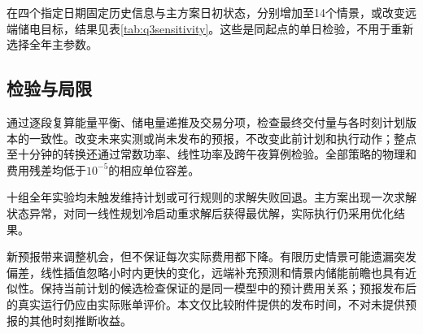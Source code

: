 在四个指定日期固定历史信息与主方案日初状态，分别增加至14个情景，或改变远端储电目标，结果见表\ref{tab:q3sensitivity}。这些是同起点的单日检验，不用于重新选择全年主参数。
\begin{table}[htbp]\centering\scriptsize
\caption{问题三的单日敏感性比较（变化量相对主方案）}\label{tab:q3sensitivity}
\resizebox{\textwidth}{!}{}
\end{table}

\subsection{检验与局限}
通过逐段复算能量平衡、储电量递推及交易分项，检查最终交付量与各时刻计划版本的一致性。改变未来实测或尚未发布的预报，不改变此前计划和执行动作；整点至十分钟的转换还通过常数功率、线性功率及跨午夜算例检验。全部策略的物理和费用残差均低于$10^{-5}$的相应单位容差。

十组全年实验均未触发维持计划或可行规则的求解失败回退。主方案出现一次求解状态异常，对同一线性规划冷启动重求解后获得最优解，实际执行仍采用优化结果。

新预报带来调整机会，但不保证每次实际费用都下降。有限历史情景可能遗漏突发偏差，线性插值忽略小时内更快的变化，远端补充预测和情景内储能前瞻也具有近似性。保持当前计划的候选检查保证的是同一模型中的预计费用关系；预报发布后的真实运行仍应由实际账单评价。本文仅比较附件提供的发布时间，不对未提供预报的其他时刻推断收益。

\clearpage
